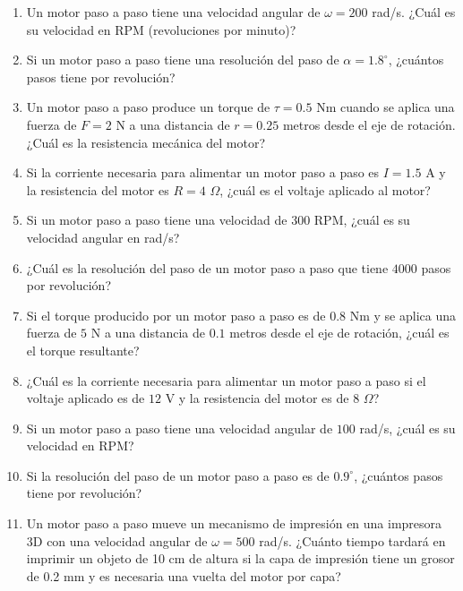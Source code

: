 \documentclass[../main]{subfiles}
\begin{document}
\begin{enumerate}
  \item Un motor paso a paso tiene una velocidad angular de \( \omega
    = 200 \) rad/s. ¿Cuál es su velocidad en RPM (revoluciones por minuto)?

  \item Si un motor paso a paso tiene una resolución del paso de \(
    \alpha = 1.8^\circ \), ¿cuántos pasos tiene por revolución?

  \item Un motor paso a paso produce un torque de \( \tau = 0.5 \) Nm
    cuando se aplica una fuerza de \( F = 2 \) N a una distancia de
    \( r = 0.25 \) metros desde el eje de rotación. ¿Cuál es la
    resistencia mecánica del motor?

  \item Si la corriente necesaria para alimentar un motor paso a paso
    es \( I = 1.5 \) A y la resistencia del motor es \( R = 4 \)
    $\Omega$, ¿cuál es el voltaje aplicado al motor?

  \item Si un motor paso a paso tiene una velocidad de \( 300 \) RPM,
    ¿cuál es su velocidad angular en rad/s?

  \item ¿Cuál es la resolución del paso de un motor paso a paso que
    tiene \( 4000 \) pasos por revolución?

  \item Si el torque producido por un motor paso a paso es de \( 0.8
    \) Nm y se aplica una fuerza de \( 5 \) N a una distancia de \(
    0.1 \) metros desde el eje de rotación, ¿cuál es el torque resultante?

  \item ¿Cuál es la corriente necesaria para alimentar un motor paso
    a paso si el voltaje aplicado es de \( 12 \) V y la resistencia
    del motor es de \( 8 \) $\Omega$?

  \item Si un motor paso a paso tiene una velocidad angular de \( 100
    \) rad/s, ¿cuál es su velocidad en RPM?

  \item Si la resolución del paso de un motor paso a paso es de \(
    0.9^\circ \), ¿cuántos pasos tiene por revolución?

  \item Un motor paso a paso mueve un mecanismo de impresión en una
    impresora 3D con una velocidad angular de \( \omega = 500 \)
    rad/s. ¿Cuánto tiempo tardará en imprimir un objeto de 10 cm de
    altura si la capa de impresión tiene un grosor de 0.2 mm y es
    necesaria una vuelta del motor por capa?


\end{enumerate}
\end{document}
